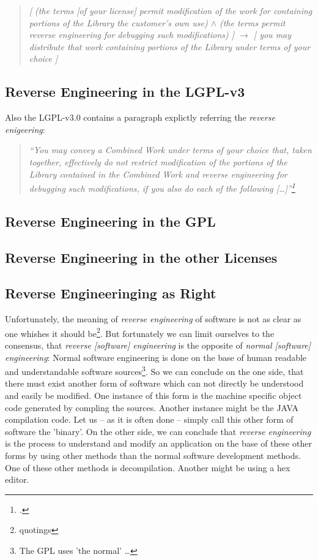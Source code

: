 \begin{quote}\noindent\emph{ [ (the terms [of your license] permit
modification of the work for containing portions of the Library the customer's
own use) $\wedge$ (the terms permit reverse engineering for debugging such
  modifications) ] $\rightarrow$ [ you may distribute that work containing
  portions of the Library under terms of your choice ]
}
\end{quote}



\subsection{Reverse Engineering in the LGPL-v3}
Also the LGPL-v3.0 contains a paragraph explictly referring the \emph{reverse
enigeering}:


\begin{quote}\emph{
\enquote{You may convey a Combined Work under terms of your choice that,
taken together, effectively \emph{do not restrict} modification of the portions
of the Library contained in the Combined Work and \emph{reverse engineering} for
debugging such modifications, if you also do each of the following
[\ldots]}\footcite[cf.][\nopage wp]{Lgpl30OsiLicense2007a}}
\end{quote}


\subsection{Reverse Engineering in the GPL}

\subsection{Reverse Engineering in the other Licenses}





\subsection{Reverse Engineeringing as Right}

Unfortunately, the meaning of \emph{reverse engineering} of software is not as
clear as one whishes it should be\footnote{quotings}. But fortunately we can
limit ourselves to the consensus, that \emph{reverse [software] engineering} is
the opposite of \emph{normal [software] engineering}: Normal software
engineering is done on the base of human readable and understandable software
sources\footnote{The GPL uses 'the normal' \ldots}. So we can conclude on the
one side, that there must exist another form of software which can not directly be
understood and easily be modified. One instance of this form is the machine
specific object code generated by compling the sources. Another instance might
be the JAVA compilation code. Let us -- as it is often done -- simply call this
other form of software the 'binary'. On the other side, we can conclude that
\emph{reverse engineering} is the process to understand and modify an application on the base of these other forms by using other methods than the normal software development
methods. One of these other methods is decompilation. Another might be using a
hex editor.

